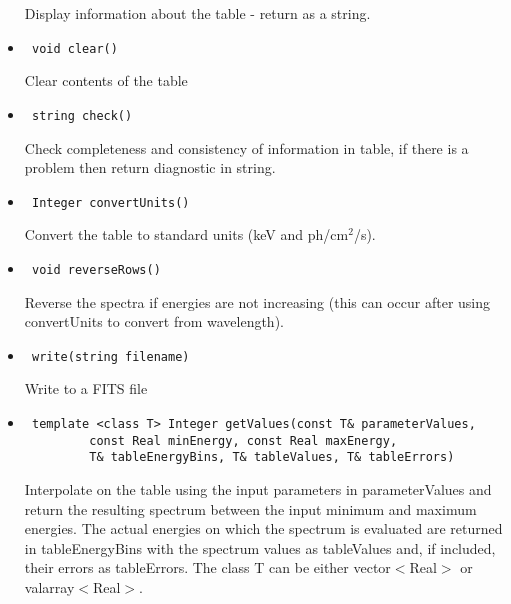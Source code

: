 \documentclass[11pt]{book}
\begin{document}
\begin{itemize}
            Display information about the table - return as a string.

\item    \begin{verbatim} void clear() \end{verbatim}

            Clear contents of the table

\item    \begin{verbatim} string check() \end{verbatim}

            Check completeness and consistency of information in table,
            if there is a problem then return diagnostic in string.

\item    \begin{verbatim} Integer convertUnits() \end{verbatim}

            Convert the table to standard units (keV and ph/cm$^2$/s).

\item    \begin{verbatim} void reverseRows() \end{verbatim}

            Reverse the spectra if energies are not increasing (this
            can occur after using convertUnits to convert from wavelength).

\item    \begin{verbatim} write(string filename) \end{verbatim}

            Write to a FITS file

\item    \begin{verbatim} template <class T> Integer getValues(const T& parameterValues, 
         const Real minEnergy, const Real maxEnergy, 
         T& tableEnergyBins, T& tableValues, T& tableErrors) \end{verbatim}

            Interpolate on the table using the input parameters in 
            parameterValues and return the resulting spectrum between
            the input minimum and maximum energies. The actual
            energies on which the spectrum is evaluated are returned
            in tableEnergyBins with the spectrum values as tableValues
            and, if included, their errors as tableErrors. The class T
            can be either vector$<$Real$>$ or valarray$<$Real$>$.

\end{itemize}
\end{document}
